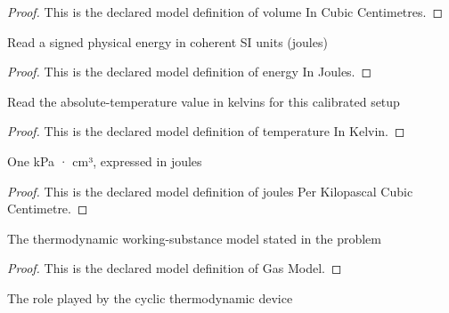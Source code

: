 \begin{proof}
  This is the declared model definition of volume In Cubic Centimetres.
\end{proof}
\begin{definition}
  \label{def:physics:phyx-mini-0429:phyxminiproblems-problemphyxmini0429-energyinjoules}
  Read a signed physical energy in coherent SI units (joules)
\end{definition}
\begin{proof}
  This is the declared model definition of energy In Joules.
\end{proof}
\begin{definition}
  \label{def:physics:phyx-mini-0429:phyxminiproblems-problemphyxmini0429-temperatureinkelvin}
  Read the absolute-temperature value in kelvins for this calibrated setup
\end{definition}
\begin{proof}
  This is the declared model definition of temperature In Kelvin.
\end{proof}
\begin{definition}
  \label{def:physics:phyx-mini-0429:phyxminiproblems-problemphyxmini0429-joulesperkilopascalcubiccentimetre}
  One kPa · cm³, expressed in joules
\end{definition}
\begin{proof}
  This is the declared model definition of joules Per Kilopascal Cubic Centimetre.
\end{proof}
\begin{definition}
  \label{def:physics:phyx-mini-0429:phyxminiproblems-problemphyxmini0429-gasmodel}
  The thermodynamic working-substance model stated in the problem
\end{definition}
\begin{proof}
  This is the declared model definition of Gas Model.
\end{proof}
\begin{definition}
  \label{def:physics:phyx-mini-0429:phyxminiproblems-problemphyxmini0429-thermodynamicdevicerole}
  The role played by the cyclic thermodynamic device
\end{definition}
